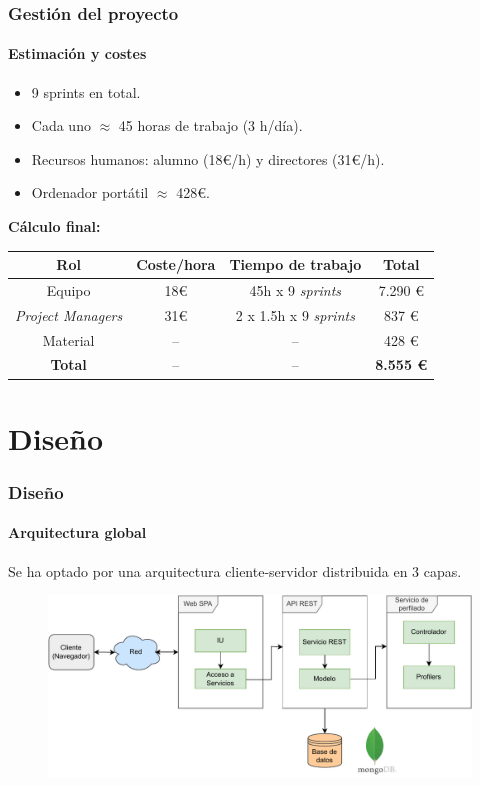 \documentclass{beamer}
\begin{document}
\begin{frame}
	\frametitle{Gestión del proyecto}
	\framesubtitle{Estimación y costes}
	\begin{itemize}
		\item 9 sprints en total. \pause
		\item Cada uno $\approx$ 45 horas de trabajo (3 h/día). \pause
		\item Recursos humanos: alumno (18€/h) y directores (31€/h).\pause
		\item Ordenador portátil $\approx$ 428€.
	\end{itemize}
	\pause
	\vspace{1cm}
\textbf{	Cálculo final:}
	\begin{table}[H]
		\centering
		{
			\setlength{\tabcolsep}{1\tabcolsep}
			\begin{tabular}{|c|c|c|c|}
				\hline
				\textbf{Rol} & \textbf{Coste/hora} & \textbf{Tiempo de trabajo} & \textbf{Total} \\ \hline
				Equipo & 18€ & 45h x 9 \textit{sprints} & 7.290 € \\ \hline
				\textit{Project Managers} & 31€ & 2 x 1.5h x 9 \textit{sprints} & 837 € \\ \hline
				Material & -- & -- & 428 € \\ \hline
				\textbf{Total} & -- & -- & \textbf{8.555 €} \\ \hline
				
			\end{tabular}%
		}
		\label{tab:metodologia/costes}
	\end{table}
	
	
\end{frame}
\section{Diseño}
	\begin{frame}
	\frametitle{Diseño}
	\framesubtitle{Arquitectura global}
	Se ha optado por una arquitectura cliente-servidor distribuida en 3 capas. \pause
	\begin{figure}[H]
		\centering
		\includegraphics[width=\textwidth]{arquitectura.pdf}
		\label{fig:diagrama/arquitectura}
	\end{figure}
\end{frame}
\end{document}
